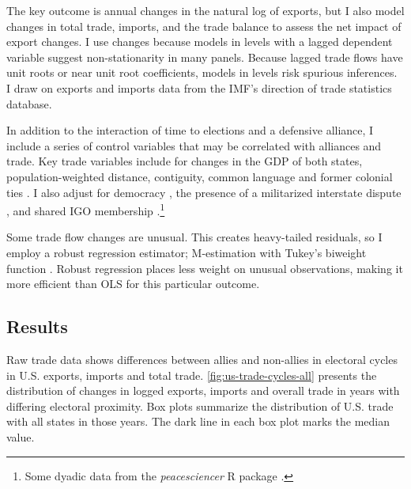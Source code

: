 \documentclass[12pt]{article}
\begin{document}
The key outcome is annual changes in the natural log of exports, but I also model changes in total trade, imports, and the trade balance to assess the net impact of export changes.
I use changes because models in levels with a lagged dependent variable suggest non-stationarity in many panels. 
Because lagged trade flows have unit roots or near unit root coefficients, models in levels risk spurious inferences.
I draw on exports and imports data from the IMF's direction of trade statistics database.


In addition to the interaction of time to elections and a defensive alliance, I include a series of control variables that may be correlated with alliances and trade. 
Key trade variables include for changes in the GDP of both states, population-weighted distance, contiguity, common language and former colonial ties \citep{FouquinHugot2016}.
I also adjust for democracy \citep{Marquez2016}, the presence of a militarized interstate dispute \citep{Gibleretal2016}, and shared IGO membership \citep{Pevehouseetal2020}.\footnote{Some dyadic data from the \textit{peacesciencer} \textsf{R} package \citep{peacesciencer-package}.}


Some trade flow changes are unusual. 
This creates heavy-tailed residuals, so I employ a robust regression estimator; M-estimation with Tukey's biweight function \citep{RaineyBaissa2020}.
Robust regression places less weight on unusual observations, making it more efficient than OLS for this particular outcome.



\subsection{Results}


Raw trade data shows differences between allies and non-allies in electoral cycles in U.S. exports, imports and total trade. 
\autoref{fig:us-trade-cycles-all} presents the distribution of changes in logged exports, imports and overall trade in years with differing electoral proximity.
Box plots summarize the distribution of U.S. trade with all states in those years. 
The dark line in each box plot marks the median value. 
\end{document}
